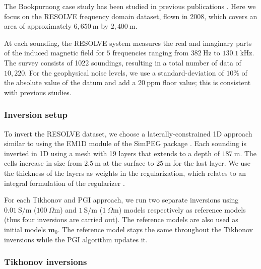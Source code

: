 \documentclass[extra]{gji} %
\begin{document}
The Bookpurnong case study has been studied in previous publications \citep{Bookpurnong,viezzoli2010,Yang2017}. Here we focus on the RESOLVE frequency domain dataset, flown in 2008, which covers an area of approximately $6,650~\text{m}$ by $2,400~\text{m}$.

At each sounding, the RESOLVE system measures the real and imaginary parts of the induced magnetic field for $5$ frequencies ranging from $382~\text{Hz}$ to $130.1~\text{kHz}$. The survey consists of 1022 soundings, resulting in a total number of data of $10,220$. For the geophysical noise levels, we use a standard-deviation of $10\%$ of the absolute value of the datum and add a $20~\text{ppm}$ floor value; this is consistent with previous studies.

\subsubsection{Inversion setup}

To invert the RESOLVE dataset, we choose a laterally-constrained 1D approach similar to \cite{Viezzoli2008} using the EM1D module of the SimPEG package \citep{heagy2017framework,SimPEGEM1DPoster}. Each sounding is inverted in 1D using a mesh with 19 layers that extends to a depth of $187~\text{m}$. The cells increase in size from $2.5~\text{m}$ at the surface to $25~\text{m}$ for the last layer. We use the thickness of the layers as weights in the regularization, which relates to an integral formulation of the regularizer \citep{doi:10.1190/1.9781560801719.ch5}.

For each Tikhonov and PGI approach, we run two separate inversions using $0.01~\text{S/m}$ ($100~\Omega \text{m}$) and $1~\text{S/m}$ ($1~\Omega \text{m}$) models respectively as reference models (thus four inversions are carried out). The reference models are also used as initial models $\mathbf{m}_0$. The reference model stays the same throughout the Tikhonov inversions while the PGI algorithm updates it.

\subsubsection{Tikhonov inversions}
\end{document}
